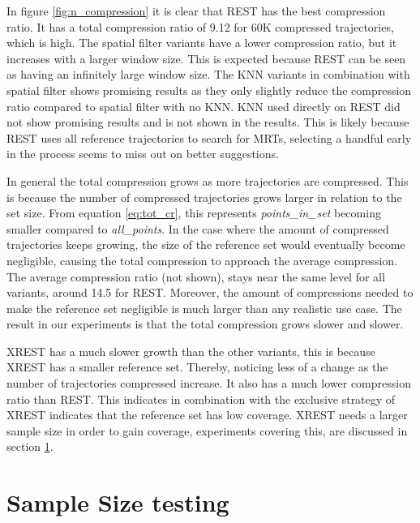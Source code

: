 In figure \ref{fig:n_compression} it is clear that REST has the best compression ratio. It has a total compression ratio of 9.12 for 60K compressed trajectories, which is high. The spatial filter variants have a lower compression ratio, but it increases with a larger window size. This is expected because REST can be seen as having an infinitely large window size. The KNN variants in combination with spatial filter shows promising results as they only slightly reduce the compression ratio compared to spatial filter with no KNN. KNN used directly on REST did not show promising results and is not shown in the results. This is likely because REST uses all reference trajectories to search for MRTs, selecting a handful early in the process seems to miss out on better suggestions.

In general the total compression grows as more trajectories are compressed. This is because the number of compressed trajectories grows larger in relation to the set size. From equation \ref{eq:tot_cr}, this represents \textit{points\_in\_set} becoming smaller compared to \textit{all\_points}. In the case where the amount of compressed trajectories keeps growing, the size of the reference set would eventually become negligible, causing the total compression to approach the average compression. The average compression ratio (not shown), stays near the same level for all variants, around 14.5 for REST. Moreover, the amount of compressions needed to make the reference set negligible is much larger than any realistic use case. The result in our experiments is that the total compression grows slower and slower.

XREST has a much slower growth than the other variants, this is because XREST has a smaller reference set. Thereby, noticing less of a change as the number of trajectories compressed increase. It also has a much lower compression ratio than REST. This indicates in combination with the exclusive strategy of XREST indicates that the reference set has low coverage. XREST needs a larger sample size in order to gain coverage, experiments covering this, are discussed in section \ref{sec:sample_size}.

\section{Sample Size testing}\label{sec:sample_size}